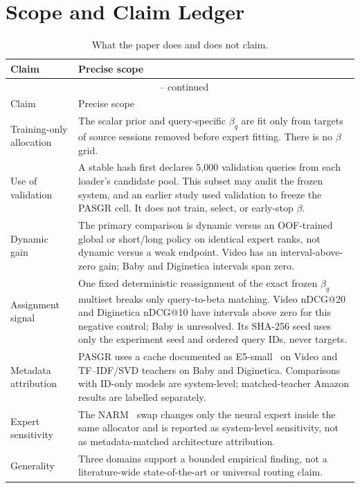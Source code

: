 \documentclass[runningheads]{llncs}
\begin{document}
\section{Scope and Claim Ledger}
\begingroup\small
\begin{longtable}{p{}p{}}
\caption{What the paper does and does not claim.}\\
\toprule
Claim & Precise scope\\
\midrule
\endfirsthead
\multicolumn{2}{c}{\tablename\ \thetable{} -- continued}\\
\toprule
Claim & Precise scope\\
\midrule
\endhead
Training-only allocation &
The scalar prior and query-specific $\beta_q$ are fit only from targets of
source sessions removed before expert fitting. There is no $\beta$ grid.\\
Use of validation &
A stable hash first declares 5,000 validation queries from each loader's
candidate pool. This subset may audit the frozen system, and an earlier study
used validation to freeze the PASGR cell. It does not train, select, or
early-stop $\beta$.\\
Dynamic gain &
The primary comparison is dynamic versus an OOF-trained global or short/long
policy on identical expert ranks, not dynamic versus a weak endpoint. Video
has an interval-above-zero gain; Baby and Diginetica intervals span zero.\\
Assignment signal &
One fixed deterministic reassignment of the exact frozen $\beta_q$ multiset breaks
only query-to-beta matching. Video nDCG@20 and Diginetica nDCG@10 have
intervals above zero for this negative control; Baby is unresolved. Its
SHA-256 seed uses only the experiment seed and ordered query IDs, never
targets.\\
Metadata attribution &
PASGR uses a cache documented as E5-small~\cite{wang2022e5} on Video and TF--IDF/SVD teachers
on Baby and Diginetica. Comparisons with ID-only models are system-level;
matched-teacher Amazon results are labelled separately.\\
Expert sensitivity &
The NARM~\cite{li2017narm} swap changes only the neural expert inside the same allocator and is
reported as system-level sensitivity, not as metadata-matched architecture
attribution.\\
Generality &
Three domains support a bounded empirical finding, not a literature-wide
state-of-the-art or universal routing claim.\\
\bottomrule
\end{longtable}
\endgroup
\end{document}
